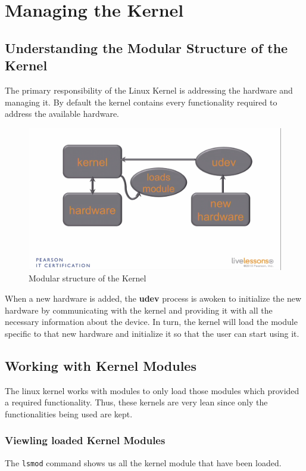 \chapter{Managing the Kernel}

\section{Understanding the Modular Structure of the Kernel}	
The primary responsibility of the Linux Kernel is addressing the hardware and managing it. By default the kernel contains every functionality required to address the available hardware. 

\begin{figure}[H]
	\centering
	\includegraphics[width=0.9\linewidth]{Mod3/chapters/3.17.a}
	\caption{Modular structure of the Kernel}
	\label{fig:3}
\end{figure}

When a new hardware is added, the \textbf{udev} process is awoken to initialize the new hardware by communicating with the kernel and providing it with all the necessary information about the device. In turn, the kernel will load the module specific to that new hardware and initialize it so that the user can start using it. 

	\section{Working with Kernel Modules}
The linux kernel works with modules to only load those modules which provided a required functionality. Thus, these kernels are very lean since only the functionalities being used are kept. 

\subsection{Viewling loaded Kernel Modules}
\vspace{-5pt}
The \verb|lsmod| command shows us all the kernel module that have been loaded. 


